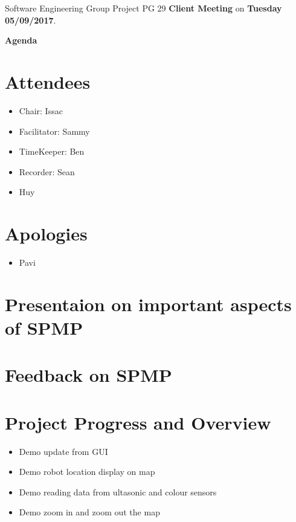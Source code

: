 \documentclass[11pt, a4paper]{article}
\begin{document}
\noindent Software Engineering Group Project PG 29 {\bf Client Meeting} on {\bf Tuesday 05/09/2017}.
\vspace*{10pt}
\begin{center}
\huge \bf Agenda
\end{center}

\section{Attendees}
\begin{itemize}
\item Chair: Issac
\item Facilitator: Sammy
\item TimeKeeper: Ben 
\item Recorder: Sean
\item Huy
\end{itemize}

\section{Apologies}
\begin{itemize}
\item Pavi
\end{itemize}

\section{Presentaion on important aspects of SPMP}

\section{Feedback on SPMP} 

\section{Project Progress and Overview}
\begin{itemize}
	\item Demo update from GUI 
	\item Demo robot location display on map
	\item Demo reading data from ultasonic and colour sensors
	\item Demo zoom in and zoom out the map 
\end{itemize}
\end{document}
